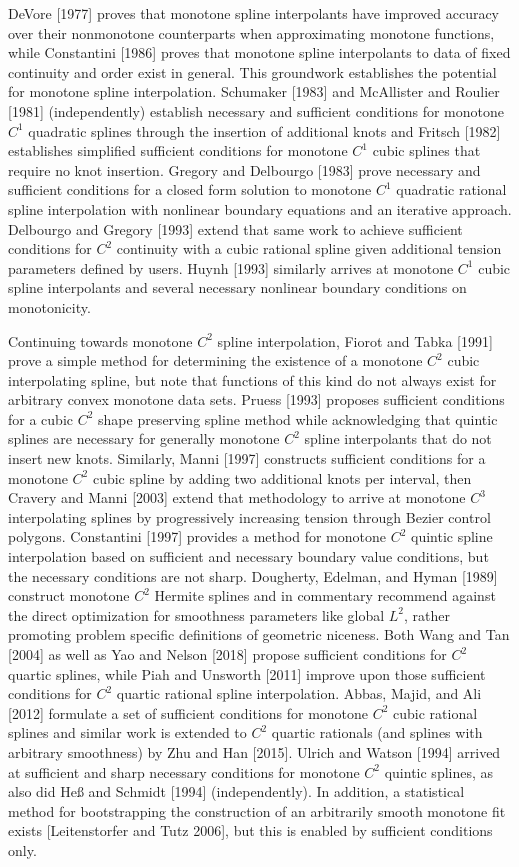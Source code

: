 DeVore [1977] proves that monotone spline interpolants have improved
accuracy over their nonmonotone counterparts when approximating
monotone functions, while Constantini [1986] proves that monotone
spline interpolants to data of fixed continuity and order exist in
general. This groundwork establishes the potential for monotone spline
interpolation. Schumaker [1983] and McAllister and Roulier [1981]
(independently) establish necessary and sufficient conditions for
monotone $C^1$ quadratic splines through the insertion of additional
knots and Fritsch [1982] establishes simplified sufficient conditions
for monotone $C^1$ cubic splines that require no knot insertion.
Gregory and Delbourgo [1983] prove necessary and sufficient conditions
for a closed form solution to monotone $C^1$ quadratic rational spline
interpolation with nonlinear boundary equations and an iterative
approach. Delbourgo and Gregory [1993] extend that same work to
achieve sufficient conditions for $C^2$ continuity with a cubic
rational spline given additional tension parameters defined by
users. Huynh [1993] similarly arrives at monotone $C^1$ cubic spline
interpolants and several necessary nonlinear boundary conditions on
monotonicity.

Continuing towards monotone $C^2$ spline interpolation, Fiorot and
Tabka [1991] prove a simple method for determining the existence of a
monotone $C^2$ cubic interpolating spline, but note that functions of
this kind do not always exist for arbitrary convex monotone data sets.
Pruess [1993] proposes sufficient conditions for a cubic $C^2$ shape
preserving spline method while acknowledging that quintic splines are
necessary for generally monotone $C^2$ spline interpolants that do not
insert new knots. Similarly, Manni [1997] constructs sufficient
conditions for a monotone $C^2$ cubic spline by adding two additional
knots per interval, then Cravery and Manni [2003] extend that
methodology to arrive at monotone $C^3$ interpolating splines by
progressively increasing tension through Bezier control
polygons. Constantini [1997] provides a method for monotone $C^2$
quintic spline interpolation based on sufficient and necessary
boundary value conditions, but the necessary conditions are not
sharp. Dougherty, Edelman, and Hyman [1989] construct monotone $C^2$
Hermite splines and in commentary recommend against the direct
optimization for smoothness parameters like global $L^2$, rather
promoting problem specific definitions of geometric niceness. Both
Wang and Tan [2004] as well as Yao and Nelson [2018] propose
sufficient conditions for $C^2$ quartic splines, while Piah and
Unsworth [2011] improve upon those sufficient conditions for $C^2$
quartic rational spline interpolation. Abbas, Majid, and Ali [2012]
formulate a set of sufficient conditions for monotone $C^2$ cubic
rational splines and similar work is extended to $C^2$ quartic
rationals (and splines with arbitrary smoothness) by Zhu and Han
[2015]. Ulrich and Watson [1994] arrived at sufficient and sharp
necessary conditions for monotone $C^2$ quintic splines, as also did
He{\ss} and Schmidt [1994] (independently). In addition, a statistical
method for bootstrapping the construction of an arbitrarily smooth
monotone fit exists [Leitenstorfer and Tutz 2006], but this is enabled
by sufficient conditions only.

